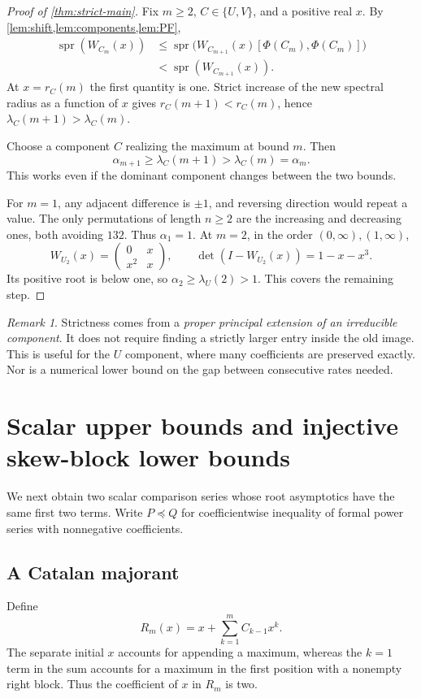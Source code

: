 \documentclass[11pt,a4paper]{article}
\theoremstyle{definition}\newaliascnt{definition}{theorem}
\theoremstyle{remark}\newaliascnt{remark}{theorem}
\newtheorem{remark}[remark]{Remark}
\newcommand{\spr}{\operatorname{spr}}
\newcommand{\preceqc}{\preceq}
\newcommand{\shift}{\Phi}
\begin{document}
\begin{proof}[Proof of \cref{thm:strict-main}]
Fix $m\ge2$, $C\in\{U,V\}$, and a positive real $x$. By
\cref{lem:shift,lem:components,lem:PF},
\begin{align*}
 \spr(W_{C_m}(x))
 &\le \spr\bigl(W_{C_{m+1}}(x)[\shift(C_m),\shift(C_m)]\bigr)\\
 &<\spr(W_{C_{m+1}}(x)).
\end{align*}
At $x=r_C(m)$ the first quantity is one. Strict increase of the new spectral
radius as a function of $x$ gives $r_C(m+1)<r_C(m)$, hence
$\lambda_C(m+1)>\lambda_C(m)$.

Choose a component $C$ realizing the maximum at bound $m$. Then
\[
 \alpha_{m+1}\ge\lambda_C(m+1)>\lambda_C(m)=\alpha_m.
\]
This works even if the dominant component changes between the two bounds.

For $m=1$, any adjacent difference is $\pm1$, and reversing direction would
repeat a value. The only permutations of length $n\ge2$ are the increasing
and decreasing ones, both avoiding $132$. Thus $\alpha_1=1$.
At $m=2$, in the order $(0,\infty),(1,\infty)$,
\[
 W_{U_2}(x)=\begin{pmatrix}0&x\\x^2&x\end{pmatrix},\qquad
 \det(I-W_{U_2}(x))=1-x-x^3.
\]
Its positive root is below one, so $\alpha_2\ge\lambda_U(2)>1$. This covers
the remaining step.
\end{proof}

\begin{remark}
Strictness comes from a \emph{proper principal extension of an irreducible
component}. It does not require finding a strictly larger entry inside the
old image. This is useful for the $U$ component, where many coefficients
are preserved exactly. Nor is a numerical lower bound on the gap between
consecutive rates needed.
\end{remark}

\section{Scalar upper bounds and injective skew-block lower bounds}
\label{sec:scalar}
We next obtain two scalar comparison series whose root asymptotics have
the same first two terms. Write $P\preceqc Q$ for coefficientwise inequality
of formal power series with nonnegative coefficients.

\subsection{A Catalan majorant}
Define
\begin{equation}
 R_m(x)=x+\sum_{k=1}^m C_{k-1}x^k.
 \label{eq:R}
\end{equation}
The separate initial $x$ accounts for appending a maximum, whereas the
$k=1$ term in the sum accounts for a maximum in the first position with a
nonempty right block. Thus the coefficient of $x$ in $R_m$ is two.
\end{document}
